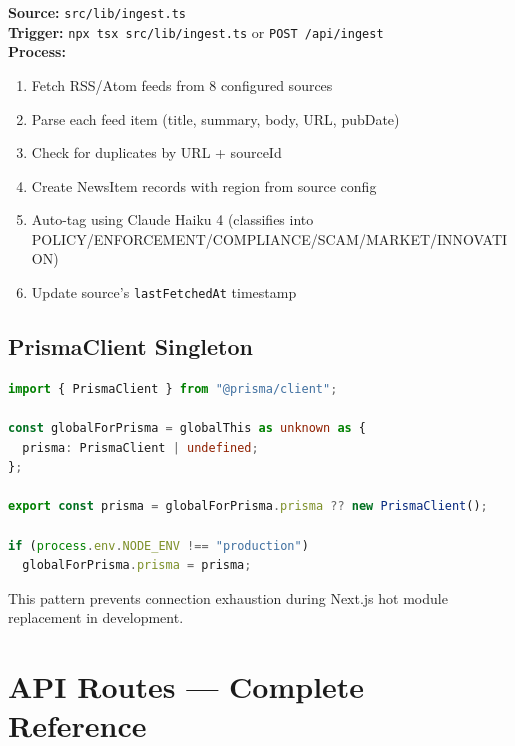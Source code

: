\documentclass[12pt,a4paper]{article}
\begin{document}
\begin{tcolorbox}[title=\textbf{Path B: Live News Data},colback=greenok!5!white,colframe=greenok!50!black]
\textbf{Source:} \texttt{src/lib/ingest.ts}\\
\textbf{Trigger:} \texttt{npx tsx src/lib/ingest.ts} or \texttt{POST /api/ingest}\\
\textbf{Process:}
\begin{enumerate}[nosep]
    \item Fetch RSS/Atom feeds from 8 configured sources
    \item Parse each feed item (title, summary, body, URL, pubDate)
    \item Check for duplicates by URL + sourceId
    \item Create NewsItem records with region from source config
    \item Auto-tag using Claude Haiku 4 (classifies into POLICY/ENFORCEMENT/COMPLIANCE/SCAM/MARKET/INNOVATION)
    \item Update source's \texttt{lastFetchedAt} timestamp
\end{enumerate}
\end{tcolorbox}

\subsection{PrismaClient Singleton}

\begin{lstlisting}[language=TypeScript,caption={src/lib/prisma.ts}]
import { PrismaClient } from "@prisma/client";

const globalForPrisma = globalThis as unknown as {
  prisma: PrismaClient | undefined;
};

export const prisma = globalForPrisma.prisma ?? new PrismaClient();

if (process.env.NODE_ENV !== "production")
  globalForPrisma.prisma = prisma;
\end{lstlisting}

This pattern prevents connection exhaustion during Next.js hot module replacement in development.

\newpage

\section{API Routes — Complete Reference}
\end{document}
